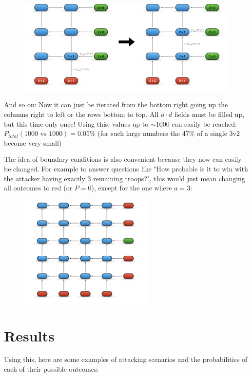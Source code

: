 \documentclass[11pt,a4paper]{article}
\begin{document}
    \begin{figure}[H]
        \centering
        \includegraphics[width=1.0\textwidth]{../images/bottom up transition.png}
    \end{figure}

    And so on: Now it can just be iterated from the bottom right going up the columns right to left or the rows bottom to top.
    All $a \cdot d$ fields must be filled up, but this time only once!
    Using this, values up to $\sim$1000 can easily be reached: $P_{total}(\text{1000 vs 1000}) = 0.05\%$ (for such large numbers the 47\% of a single 3v2 become very small)

    The idea of boundary conditions is also convenient because they now can easily be changed.
    For example to answer questions like "How probable is it to win with the attacker having exactly 3 remaining troops?", this would just mean changing all outcomes to red (or $P=0$), except for the one where $a=3$:

    \begin{figure}[H]
        \centering
        \includegraphics[width=0.6\textwidth]{../images/Boundary Conditions.png}
    \end{figure}


    \section{Results}
    Using this, here are some examples of attacking scenarios and the probabilities of each of their possible outcomes:
\end{document}
